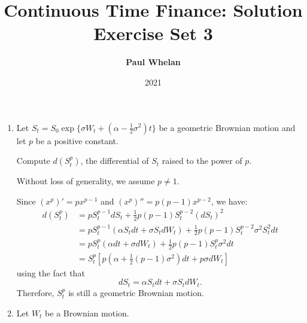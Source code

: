 \documentclass[handout,8pt]{beamer}
\title{Continuous Time Finance: Solution Exercise Set 3}
\author{\textbf{Paul Whelan}}
\institute{Copenhagen Business School}
\date{2021}
\begin{document}
\begin{frame}
     \titlepage
\end{frame}






\begin{frame}[allowframebreaks]{ }



\begin{enumerate}
    \item Let $S_t=S_0\exp\{\sigma W_t+(\alpha - \frac{1}{2}\sigma^2)t\}$ be a geometric Brownian motion and let $p$ be a positive constant. \newline
    
    Compute $d(S_t^p)$, the differential of $S_t$ raised to the power of $p$.\newline
    
    Without loss of generality, we assume $p \neq 1 $. \newline
    
    Since $(x^p)'=px^{p-1}$ and $(x^p)''=p(p-1)x^{p-2}$, we have:
    \begin{align*}
        d(S_t^p) &= pS_t^{p-1} dS_t + \frac{1}{2}p(p-1)S_t^{p-2} (dS_t)^2\\
        &= pS_t^{p-1}(\alpha S_t dt + \sigma S_t dW_t) +\frac{1}{2}p(p-1)S_t^{p-2}\sigma^2 S_t^2 dt\\
        &= pS_t^p(\alpha dt + \sigma dW_t) + \frac{1}{2}p(p-1)S_t^p\sigma^2 dt\\
        &= S_t^p \left[p (\alpha + \frac{1}{2}(p-1)\sigma^2) dt + p \sigma dW_t \right]
    \end{align*}
    using the fact that
    \begin{equation*}
        dS_t = \alpha S_t dt + \sigma S_t dW_t.
    \end{equation*}
    Therefore, $S_t^p$ is still a geometric Brownian motion.
    
    \item Let $W_t$ be a Brownian motion.
    

\end{enumerate}
\end{frame}
\end{document}
